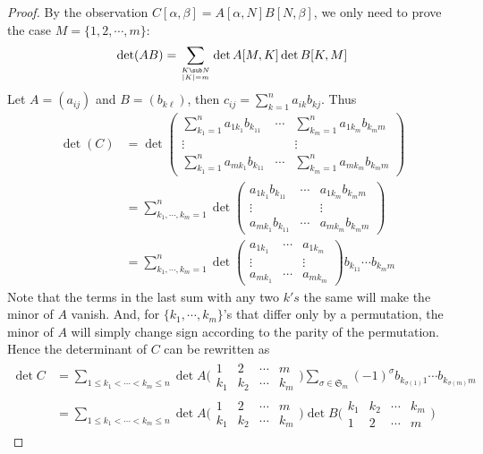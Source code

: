 \begin{proof}
By the observation $C[\alpha,\beta]=A[\alpha,N]B[N,\beta]$, we only need to prove the case $M=\{1,2,\cdots,m\}$:
\[\det(AB)=\sum_{K\sub N\atop|K|=m}\det A[M,K]\det B[K,M]\]
Let $A=(a_{ij})$ and $B=(b_{k\ell})$, then $c_{ij}=\sum_{k=1}^{n}a_{ik}b_{kj}$. Thus
\begin{align*}
\det(C)&=\det\begin{pmatrix}
\sum_{k_1=1}^{n}a_{1k_1}b_{k_11}&\cdots&\sum_{k_m=1}^{n}a_{1k_m}b_{k_mm}\\
\vdots&&\vdots\\
\sum_{k_1=1}^{n}a_{mk_1}b_{k_11}&\cdots&\sum_{k_m=1}^{n}a_{mk_m}b_{k_mm}
\end{pmatrix}\\
&=\sum_{k_1,\cdots,k_m=1}^{n}\det\begin{pmatrix}
a_{1k_1}b_{k_11}&\cdots&a_{1k_m}b_{k_mm}\\
\vdots&&\vdots\\
a_{mk_1}b_{k_11}&\cdots&a_{mk_m}b_{k_mm}
\end{pmatrix}\\
&=\sum_{k_1,\cdots,k_m=1}^{n}\det\begin{pmatrix}
a_{1k_1}&\cdots&a_{1k_m}\\
\vdots&&\vdots\\
a_{mk_1}&\cdots&a_{mk_m}
\end{pmatrix}b_{k_11}\cdots b_{k_mm}
\end{align*}
Note that the terms in the last sum with any two $k's$ the same will make the minor of $A$ vanish. And, for $\{k_1,\cdots,k_m\}$'s that differ only by a permutation, the minor of $A$ will simply change sign according to the parity of the permutation. Hence the determinant of $C$ can be rewritten as
\begin{align*}
\det C&=\sum_{1\leq k_1<\cdots<k_m\leq n}\det A\Big(\begin{array}{llll}
1&2&\cdots&m\\
k_1&k_2&\cdots&k_m
\end{array}\Big)\sum_{\sigma\in\mathfrak{S}_m}(-1)^{\sigma}b_{k_{\sigma(1)}1}\cdots b_{k_{\sigma(m)}m}\\
&=\sum_{1\leq k_1<\cdots<k_m\leq n}\det A\Big(\begin{array}{llll}
1&2&\cdots&m\\
k_1&k_2&\cdots&k_m
\end{array}\Big)\det B\Big(\begin{array}{llll}
k_1&k_2&\cdots&k_m\\
1&2&\cdots&m
\end{array}\Big)
\end{align*}
\end{proof}
